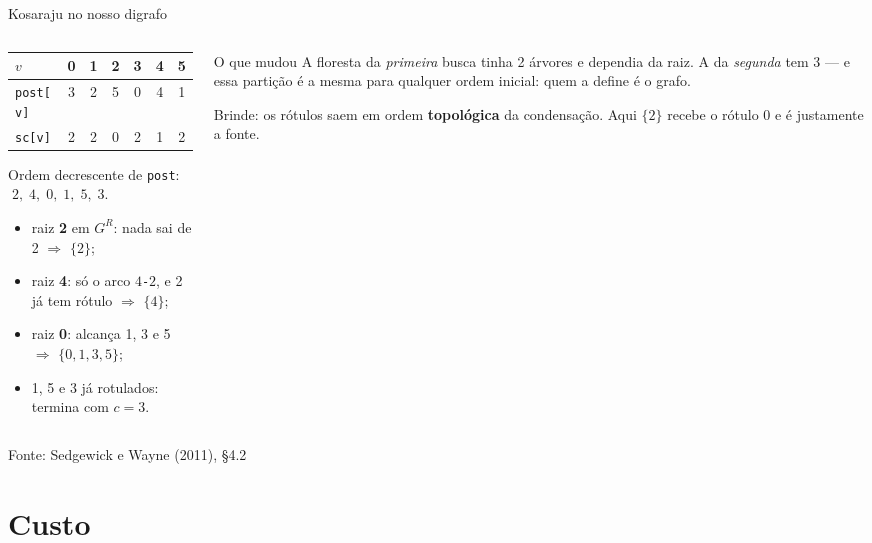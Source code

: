 \documentclass[aspectratio=169]{beamer}
\newcommand{\fonte}[1]{\vfill{\tiny\color{gray!60!black}Fonte: #1\par}}
\begin{document}
\begin{frame}{Kosaraju no nosso digrafo}
  \begin{columns}[T]
    \begin{column}{0.50\textwidth}
      {\scriptsize
      \begin{tabular}{lcccccc}
        \toprule
        $v$ & 0 & 1 & 2 & 3 & 4 & 5 \\
        \midrule
        \texttt{post[v]} & 3 & 2 & 5 & 0 & 4 & 1 \\
        \texttt{sc[v]}   & 2 & 2 & 0 & 2 & 1 & 2 \\
        \bottomrule
      \end{tabular}}

      \medskip
      {\scriptsize Ordem decrescente de \texttt{post}: $\;2,\;4,\;0,\;1,\;5,\;3$.

      \begin{itemize}\scriptsize\setlength{\itemsep}{1pt}
        \item raiz \textbf{2} em $G^R$: nada sai de 2 $\Rightarrow$ $\{2\}$;
        \item raiz \textbf{4}: só o arco $4$\texttt{-}$2$, e 2 já tem rótulo
              $\Rightarrow$ $\{4\}$;
        \item raiz \textbf{0}: alcança 1, 3 e 5 $\Rightarrow$ $\{0,1,3,5\}$;
        \item 1, 5 e 3 já rotulados: termina com $c = 3$.
      \end{itemize}}
    \end{column}
    \begin{column}{0.46\textwidth}
      \begin{exampleblock}{O que mudou}
        {\scriptsize A floresta da \emph{primeira} busca tinha 2 árvores e
        dependia da raiz. A da \emph{segunda} tem 3 --- e essa partição é a
        mesma para qualquer ordem inicial: quem a define é o grafo.}
      \end{exampleblock}
      {\scriptsize Brinde: os rótulos saem em ordem \textbf{topológica} da
      condensação. Aqui $\{2\}$ recebe o rótulo 0 e é justamente a fonte.}
    \end{column}
  \end{columns}
  \fonte{Sedgewick e Wayne (2011), \S 4.2~\cite{sedgewick2011algorithms}}
\end{frame}

\section{Custo}
\end{document}
